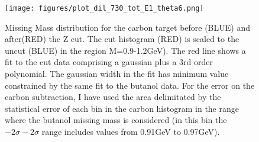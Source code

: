 \begin{figure}[H]
  \begin{center}
    \texttt{[image: figures/plot\_dil\_730\_tot\_E1\_theta6.png]} \\
    \caption{Missing Mass distribution for the carbon target before (BLUE) and after(RED) the Z cut. The cut histogram (RED) is scaled to the uncut (BLUE) in the region M=0.9-1.2GeV). The red line shows a fit to the cut data comprising a gaussian plus a 3rd order polynomial. The gaussian width in the fit has minimum value constrained by the same fit to the butanol data.  
 For the error on the carbon subtraction, I have used the area delimitated by the statistical error of each bin in the carbon histogram in the range where the butanol missing mass is considered (in this bin the $-2\sigma - 2\sigma$ range includes values from 0.91GeV to 0.97GeV).}
    \label{fig:dilution_mass_zcut}
  \end{center}
\end{figure}


